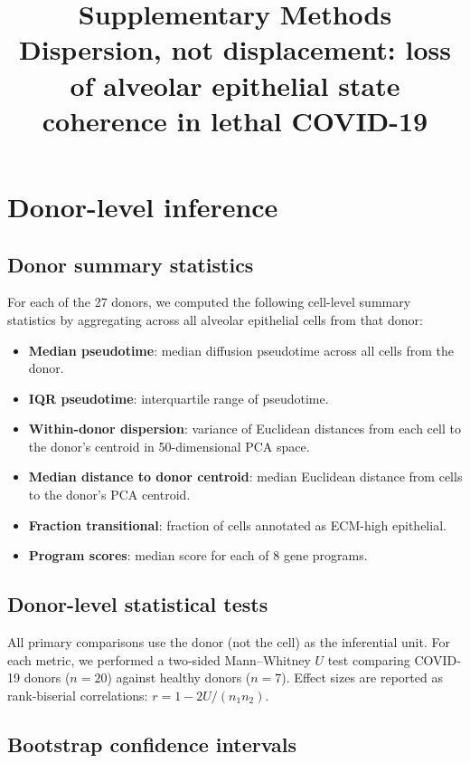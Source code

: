 \documentclass[11pt]{article}
\title{Supplementary Methods\\Dispersion, not displacement: loss of alveolar epithelial state coherence in lethal COVID-19}
\author{}
\date{}
\begin{document}
\maketitle

\section{Donor-level inference}

\subsection{Donor summary statistics}

For each of the 27 donors, we computed the following cell-level summary statistics by aggregating across all alveolar epithelial cells from that donor:
\begin{itemize}
    \item \textbf{Median pseudotime}: median diffusion pseudotime across all cells from the donor.
    \item \textbf{IQR pseudotime}: interquartile range of pseudotime.
    \item \textbf{Within-donor dispersion}: variance of Euclidean distances from each cell to the donor's centroid in 50-dimensional PCA space.
    \item \textbf{Median distance to donor centroid}: median Euclidean distance from cells to the donor's PCA centroid.
    \item \textbf{Fraction transitional}: fraction of cells annotated as ECM-high epithelial.
    \item \textbf{Program scores}: median score for each of 8 gene programs.
\end{itemize}

\subsection{Donor-level statistical tests}

All primary comparisons use the donor (not the cell) as the inferential unit. For each metric, we performed a two-sided Mann--Whitney $U$ test comparing COVID-19 donors ($n = 20$) against healthy donors ($n = 7$). Effect sizes are reported as rank-biserial correlations: $r = 1 - 2U/(n_1 n_2)$.

\subsection{Bootstrap confidence intervals}
\end{document}
